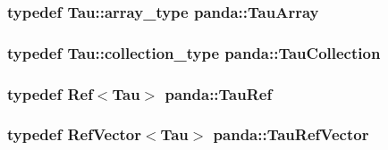 \label{namespacepanda_aa60eddc3c2149493db37c9984a52395f}
\hypertarget{namespacepanda_ac9df7e06c1479da7e998d1e8542490fa}{
\subsubsection[{TauArray}]{\setlength{\rightskip}{0pt plus 5cm}typedef {\bf Tau::array\_\-type} {\bf panda::TauArray}}}
\label{namespacepanda_ac9df7e06c1479da7e998d1e8542490fa}
\hypertarget{namespacepanda_a4af7b5c7acf5a2c804cabb3e08ea5b8e}{
\subsubsection[{TauCollection}]{\setlength{\rightskip}{0pt plus 5cm}typedef {\bf Tau::collection\_\-type} {\bf panda::TauCollection}}}
\label{namespacepanda_a4af7b5c7acf5a2c804cabb3e08ea5b8e}
\hypertarget{namespacepanda_aa3bb14459c0d3bdcebf8e232b988340f}{
\subsubsection[{TauRef}]{\setlength{\rightskip}{0pt plus 5cm}typedef {\bf Ref}$<${\bf Tau}$>$ {\bf panda::TauRef}}}
\label{namespacepanda_aa3bb14459c0d3bdcebf8e232b988340f}
\hypertarget{namespacepanda_a4887667837e56b43adcea0e5f59eb72c}{
\subsubsection[{TauRefVector}]{\setlength{\rightskip}{0pt plus 5cm}typedef {\bf RefVector}$<${\bf Tau}$>$ {\bf panda::TauRefVector}}}
\label{namespacepanda_a4887667837e56b43adcea0e5f59eb72c}


